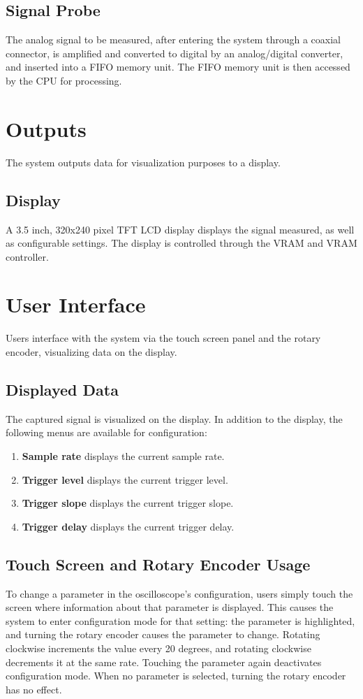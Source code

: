 \documentclass{scrartcl}
\begin{document}
	\subsection*{Signal Probe}
	The analog signal to be measured, after entering the system through a coaxial connector, is amplified and converted to digital by an analog/digital converter, and inserted into a FIFO memory unit. The FIFO memory unit is then accessed by the CPU for processing.
	
	\section*{Outputs}
	The system outputs data for visualization purposes to a display.
	
	\subsection*{Display}
	A 3.5 inch, 320x240 pixel TFT LCD display displays the signal measured, as well as configurable settings. The display is controlled through the VRAM and VRAM controller.
	
	\section*{User Interface}
	Users interface with the system via the touch screen panel and the rotary encoder, visualizing data on the display.
	
	\subsection*{Displayed Data}
	The captured signal is visualized on the display. In addition to the display, the following menus are available for configuration:
	\begin{enumerate}
		\item \textbf{Sample rate} displays the current sample rate.
		\item \textbf{Trigger level} displays the current trigger level.
		\item \textbf{Trigger slope} displays the current trigger slope.
		\item \textbf{Trigger delay} displays the current trigger delay.
	\end{enumerate}
	
	\subsection*{Touch Screen and Rotary Encoder Usage}
	To change a parameter in the oscilloscope's configuration, users simply touch the screen where information about that parameter is displayed. This causes the system to enter configuration mode for that setting: the parameter is highlighted, and turning the rotary encoder causes the parameter to change. Rotating clockwise increments the value every 20 degrees, and rotating clockwise decrements it at the same rate. Touching the parameter again deactivates configuration mode. When no parameter is selected, turning the rotary encoder has no effect.
\end{document}
